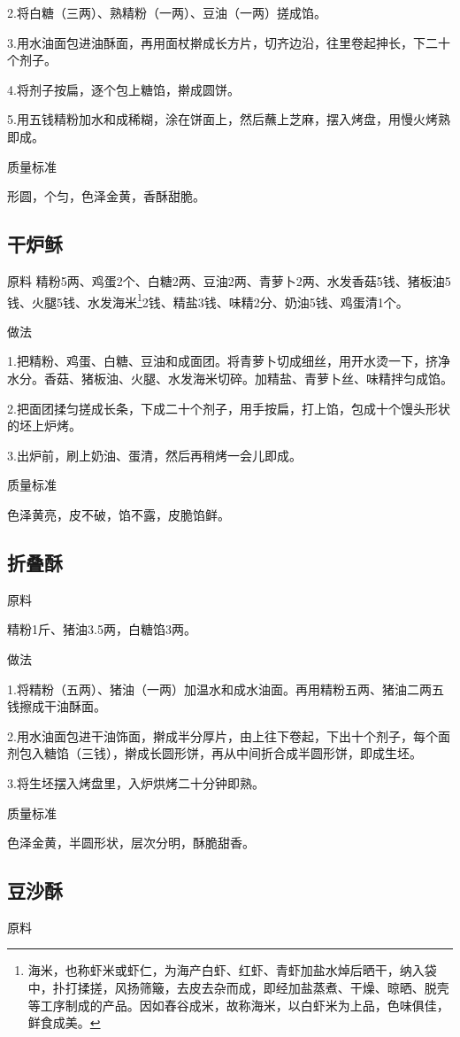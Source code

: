 \documentclass{ctexbook}
\begin{document}
2.将白糖（三两）、熟精粉（一两）、豆油（一两）搓成馅。

3.用水油面包进油酥面，再用面杖擀成长方片，切齐边沿，往里卷起抻长，下二十个剂子。

4.将剂子按扁，逐个包上糖馅，擀成圆饼。

5.用五钱精粉加水和成稀糊，涂在饼面上，然后蘸上芝麻，摆入烤盘，用慢火烤熟即成。

质量标准

形圆，个匀，色泽金黄，香酥甜脆。
\subsection{干炉稣}
原料
精粉5两、鸡蛋2个、白糖2两、豆油2两、青萝卜2两、水发香菇5钱、猪板油5钱、火腿5钱、水发海米\footnote{海米，也称虾米或虾仁，为海产白虾、红虾、青虾加盐水焯后晒干，纳入袋中，扑打揉搓，风扬筛簸，去皮去杂而成，即经加盐蒸煮、干燥、晾晒、脱壳等工序制成的产品。因如舂谷成米，故称海米，以白虾米为上品，色味俱佳，鲜食成美。}2钱、精盐3钱、味精2分、奶油5钱、鸡蛋清1个。

做法

1.把精粉、鸡蛋、白糖、豆油和成面团。将青萝卜切成细丝，用开水烫一下，挤净水分。香菇、猪板油、火腿、水发海米切碎。加精盐、青萝卜丝、味精拌匀成馅。

2.把面团揉匀搓成长条，下成二十个剂子，用手按扁，打上馅，包成十个馒头形状的坯上炉烤。

3.出炉前，刷上奶油、蛋清，然后再稍烤一会儿即成。

质量标准

色泽黄亮，皮不破，馅不露，皮脆馅鲜。
\subsection{折叠酥}
原料

精粉1斤、猪油3.5两，白糖馅3两。

做法

1.将精粉（五两）、猪油（一两）加温水和成水油面。再用精粉五两、猪油二两五钱擦成干油酥面。

2.用水油面包进干油饰面，擀成半分厚片，由上往下卷起，下出十个剂子，每个面剂包入糖馅（三钱），擀成长圆形饼，再从中间折合成半圆形饼，即成生坯。

3.将生坯摆入烤盘里，入炉烘烤二十分钟即熟。

质量标准

色泽金黄，半圆形状，层次分明，酥脆甜香。
\subsection{豆沙酥}
原料
\end{document}
